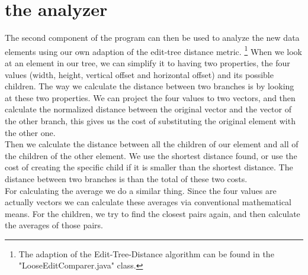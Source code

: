 \section{the analyzer}
The second component of the program can then be used to analyze the new data elements using our own adaption of the edit-tree distance metric.%
\footnote{The adaption of the Edit-Tree-Distance algorithm can be found in the "LooseEditComparer.java" class.}
When we look at an element in our tree, we can simplify it to having two properties, the four values (width, height, vertical offset and horizontal offset) and its possible children. The way we calculate the distance between two branches is by looking at these two properties. We can project the four values to two vectors, and then calculate the normalized distance between the original vector and the vector of the other branch, this gives us the cost of substituting the original element with the other one.\\
Then we calculate the distance between all the children of our element and all of the children of the other element. We use the shortest distance found, or use the cost of creating the specific child if it is smaller than the shortest distance. The distance between two branches is than the total of these two costs.\\
For calculating the average we do a similar thing. Since the four values are actually vectors we can calculate these averages via conventional mathematical means. For the children, we try to find the closest pairs again, and then calculate the averages of those pairs.
